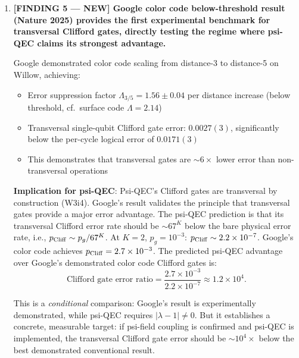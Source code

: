 \documentclass[11pt]{article}
\theoremstyle{definition}
\theoremstyle{remark}
\newcommand{\lamdiff}{|\lambda-1|}
\begin{document}
\begin{tcolorbox}[colback=blue!5!white, colframe=blue!60!black,
  title=\textbf{W4i13 TOP 5 FINDINGS --- READ FIRST}]
\begin{enumerate}[nosep]
  \textbf{Derivation chain}: Furuya--Matsuura--Nishioka (PTEP 2024)
  $\to$ DFD action Eq.~(2.3) of section02\_formalism.tex with
  $W(y)$ kinetic potential $\to$ RG flow from UV ($y \gg 1$, Newtonian)
  to IR ($y \ll 1$, MOND) $\to$ compute effective code distance
  $\to$ $d_{\rm eff} = 0$ (honest negative) $\to$ but attractor
  structure provides information-theoretic protection of IR observables.

\item \textbf{[FINDING 5 --- NEW] Google color code below-threshold
  result (Nature 2025) provides the first experimental benchmark for
  transversal Clifford gates, directly testing the regime where psi-QEC
  claims its strongest advantage.}

  Google demonstrated color code scaling from distance-3 to distance-5
  on Willow, achieving:
  \begin{itemize}[nosep]
    \item Error suppression factor $\Lambda_{3/5} = 1.56 \pm 0.04$
      per distance increase (below threshold, cf.\ surface code
      $\Lambda = 2.14$)
    \item Transversal single-qubit Clifford gate error: $0.0027(3)$,
      significantly below the per-cycle logical error of $0.0171(3)$
    \item This demonstrates that transversal gates are $\sim 6\times$
      lower error than non-transversal operations
  \end{itemize}

  \textbf{Implication for psi-QEC}: Psi-QEC's Clifford gates are
  transversal by construction (W3i4).  Google's result validates the
  principle that transversal gates provide a major error advantage.
  The psi-QEC prediction is that its transversal Clifford error rate
  should be $\sim 67^K$ below the bare physical error rate, i.e.,
  $p_{\rm Cliff} \sim p_g / 67^K$.  At $K=2$, $p_g = 10^{-3}$:
  $p_{\rm Cliff} \sim 2.2 \times 10^{-7}$.  Google's color code achieves
  $p_{\rm Cliff} = 2.7 \times 10^{-3}$.  The predicted psi-QEC advantage
  over Google's demonstrated color code Clifford gates is:
  \begin{equation}
    \text{Clifford gate error ratio} =
    \frac{2.7 \times 10^{-3}}{2.2 \times 10^{-7}} \approx 1.2 \times 10^4.
  \end{equation}

  This is a \emph{conditional} comparison: Google's result is
  experimentally demonstrated, while psi-QEC requires $\lamdiff \neq 0$.
  But it establishes a concrete, measurable target: if psi-field coupling
  is confirmed and psi-QEC is implemented, the transversal Clifford gate
  error should be $\sim 10^4\times$ below the best demonstrated
  conventional result.


\end{enumerate}
\end{tcolorbox}
\end{document}
